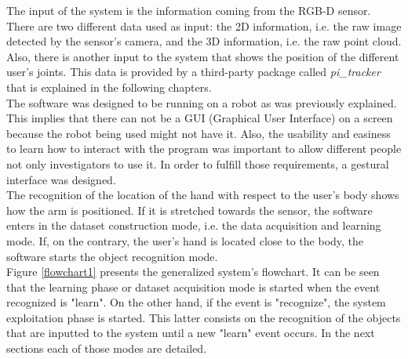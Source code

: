 The input of the system is the information coming from the RGB-D sensor. 
There are two different data used as input: the 2D information, i.e. the raw image detected by the sensor's camera, and the 3D information, i.e. the raw point cloud. 
Also, there is another input to the system that shows the position of the different user's joints. This data is provided by a third-party package called \textit{pi\_tracker} that is explained in the following chapters. 
\\

The software was designed to be running on a robot as was previously explained. 
This implies that there can not be a GUI (Graphical User Interface) on a screen because the robot being used might not have it. 
Also, the usability and easiness to learn how to interact with the program was important to allow different people not only investigators to use it. 
In order to fulfill those requirements, a gestural interface was designed. 
\\

The recognition of the location of the hand with respect to the user's body shows how the arm is positioned. 
If it is stretched towards the sensor, the software enters in the dataset construction mode, i.e. the data acquisition and learning mode. 
If, on the contrary, the user's hand is located close to the body, the software starts the object recognition mode. 
\\

Figure \ref{flowchart1} presents the generalized system's flowchart. 
It can be seen that the learning phase or dataset acquisition mode is started when the event recognized is "learn". 
On the other hand, if the event is "recognize", the system exploitation phase is started. 
This latter consists on the recognition of the objects that are inputted to the system until a new "learn" event occurs. 
In the next sections each of those modes are detailed. 


